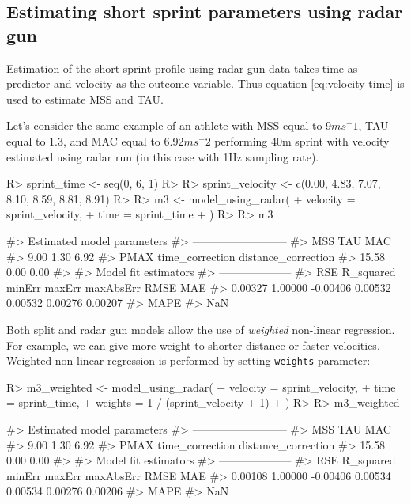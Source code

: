 \documentclass[
]{jss}
\begin{document}
\hypertarget{estimating-short-sprint-parameters-using-radar-gun}{%
\subsection{Estimating short sprint parameters using radar gun}\label{estimating-short-sprint-parameters-using-radar-gun}}

Estimation of the short sprint profile using radar gun data takes time as predictor and velocity as the outcome variable. Thus equation \eqref{eq:velocity-time} is used to estimate MSS and TAU.

Let's consider the same example of an athlete with MSS equal to 9\(ms^-1\), TAU equal to 1.3, and MAC equal to 6.92\(ms^-2\) performing 40m sprint with velocity estimated using radar run (in this case with 1Hz sampling rate).

\begin{CodeChunk}
\begin{CodeInput}
R> sprint_time <- seq(0, 6, 1)
R> 
R> sprint_velocity <- c(0.00, 4.83, 7.07, 8.10, 8.59, 8.81, 8.91)
R> 
R> m3 <- model_using_radar(
+   velocity = sprint_velocity,
+   time = sprint_time
+ )
R> 
R> m3
\end{CodeInput}
\begin{CodeOutput}
#> Estimated model parameters
#> --------------------------
#>                 MSS                 TAU                 MAC 
#>                9.00                1.30                6.92 
#>                PMAX     time_correction distance_correction 
#>               15.58                0.00                0.00 
#> 
#> Model fit estimators
#> --------------------
#>       RSE R_squared    minErr    maxErr maxAbsErr      RMSE       MAE 
#>   0.00327   1.00000  -0.00406   0.00532   0.00532   0.00276   0.00207 
#>      MAPE 
#>       NaN
\end{CodeOutput}
\end{CodeChunk}

Both split and radar gun models allow the use of \emph{weighted} non-linear regression. For example, we can give more weight to shorter distance or faster velocities. Weighted non-linear regression is performed by setting \texttt{weights} parameter:

\begin{CodeChunk}
\begin{CodeInput}
R> m3_weighted <- model_using_radar(
+   velocity = sprint_velocity,
+   time = sprint_time,
+   weights = 1 / (sprint_velocity + 1)
+ )
R> 
R> m3_weighted
\end{CodeInput}
\begin{CodeOutput}
#> Estimated model parameters
#> --------------------------
#>                 MSS                 TAU                 MAC 
#>                9.00                1.30                6.92 
#>                PMAX     time_correction distance_correction 
#>               15.58                0.00                0.00 
#> 
#> Model fit estimators
#> --------------------
#>       RSE R_squared    minErr    maxErr maxAbsErr      RMSE       MAE 
#>   0.00108   1.00000  -0.00406   0.00534   0.00534   0.00276   0.00206 
#>      MAPE 
#>       NaN
\end{CodeOutput}
\end{CodeChunk}
\end{document}
